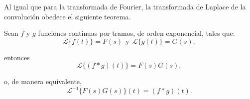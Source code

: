 Al igual que para la transformada de Fourier, la transformada de Laplace de la convolución obedece el siguiente teorema.

\begin{teorema}[de Convolución] \label{Teo:Convolucion}
    Sean $f$ y $g$ funciones continuas por tramos, de orden exponencial, tales que:
    \begin{equation*}
    \mathcal{L}\{f(t)\} = F(s) ~~\mbox{y}~~ \mathcal{L}\{g(t)\} = G(s),
    \end{equation*}

    entonces
    \begin{equation*}
    \mathcal{L}\{(f*g)(t)\} = F(s)G(s),
    \end{equation*}

    o, de manera equivalente,
    \begin{equation*}
    \mathcal{L}^{-1}\{F(s)G(s)\}(t) = (f*g)(t).
    \end{equation*}    
\end{teorema}

